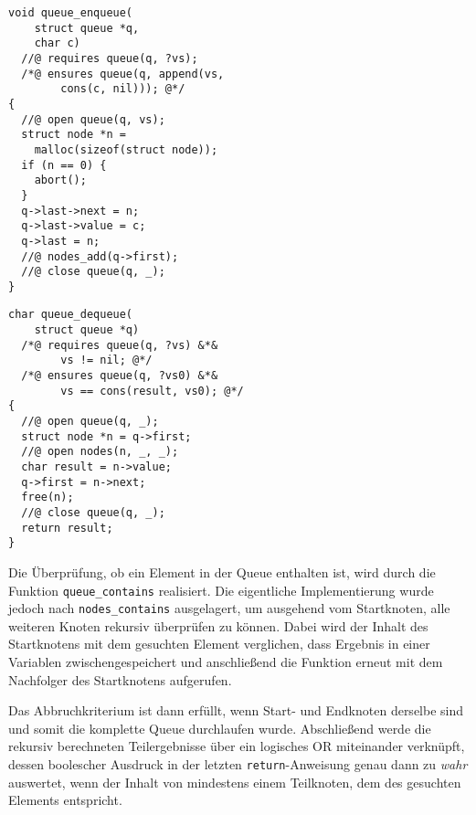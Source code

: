 \vspace{-10pt}
{\noindent
\begin{minipage}[t]{.45\textwidth}
\begin{lstlisting}
void queue_enqueue(
    struct queue *q,
    char c)
  //@ requires queue(q, ?vs);
  /*@ ensures queue(q, append(vs,
        cons(c, nil))); @*/
{
  //@ open queue(q, vs);
  struct node *n =
    malloc(sizeof(struct node));
  if (n == 0) {
    abort();
  }
  q->last->next = n;
  q->last->value = c;
  q->last = n;
  //@ nodes_add(q->first);
  //@ close queue(q, _);
}
\end{lstlisting}
\end{minipage}
\hfill
\begin{minipage}[t]{.45\textwidth}
\begin{lstlisting}
char queue_dequeue(
    struct queue *q)
  /*@ requires queue(q, ?vs) &*&
        vs != nil; @*/
  /*@ ensures queue(q, ?vs0) &*&
        vs == cons(result, vs0); @*/
{
  //@ open queue(q, _);
  struct node *n = q->first;
  //@ open nodes(n, _, _);
  char result = n->value;
  q->first = n->next;
  free(n);
  //@ close queue(q, _);
  return result;
}
\end{lstlisting}
\end{minipage}
}

\noindent
Die Überprüfung, ob ein Element in der Queue enthalten ist, wird durch die Funktion \texttt{queue\_contains} realisiert. Die eigentliche Implementierung wurde jedoch nach \texttt{nodes\_contains} ausgelagert, um ausgehend vom Startknoten, alle weiteren Knoten rekursiv überprüfen zu können. Dabei wird der Inhalt des Startknotens mit dem gesuchten Element verglichen, dass Ergebnis in einer Variablen zwischengespeichert und anschließend die Funktion erneut mit dem Nachfolger des Startknotens aufgerufen.

Das Abbruchkriterium ist dann erfüllt, wenn Start- und Endknoten derselbe sind und somit die komplette Queue durchlaufen wurde. Abschließend werde die rekursiv berechneten Teilergebnisse über ein logisches OR miteinander verknüpft, dessen boolescher Ausdruck in der letzten \texttt{return}-Anweisung genau dann zu \emph{wahr} auswertet, wenn der Inhalt von mindestens einem Teilknoten, dem des gesuchten Elements entspricht.

